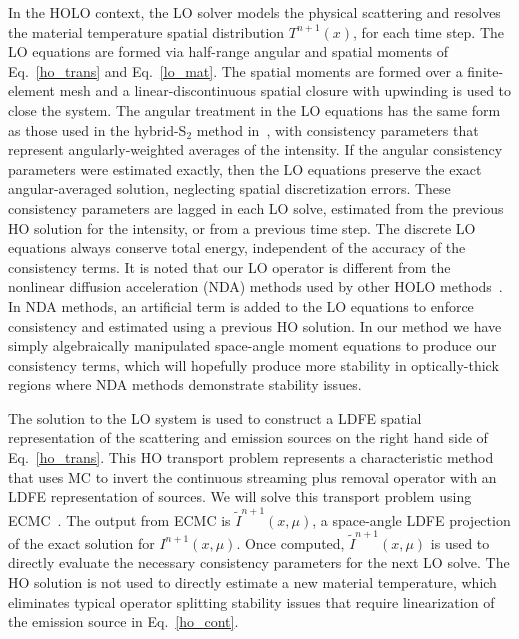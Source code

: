 \documentclass[11pt]{article}
\begin{document}
In the HOLO context, the LO solver models the physical scattering and
resolves the material temperature spatial distribution $T^{n+1}(x)$, for each time step.  The LO equations are formed via half-range 
angular and spatial moments of
Eq.~\eqref{ho_trans} and Eq.~\eqref{lo_mat}. The spatial moments are formed over a
finite-element
mesh and a linear-discontinuous spatial closure with upwinding is used to close the
system.  The angular treatment in the LO equations has the same form as those used in the
hybrid-S$_2$ method in~\cite{wolters},  with
consistency parameters that represent angularly-weighted averages of the intensity.
If the angular consistency parameters were estimated exactly, then
the LO equations preserve the exact angular-averaged solution,  neglecting spatial
discretization errors.  These consistency parameters are lagged in each LO solve,
estimated from the previous HO solution for the intensity, or from a previous time
step.  The discrete LO equations always conserve total energy, independent of the accuracy of the consistency terms.
It is noted that our LO operator is different from the nonlinear
diffusion acceleration (NDA) methods used by other HOLO methods~\cite{rmc,park,willert}.  In
NDA methods, an artificial term is added to the LO equations to enforce consistency and estimated using a
previous HO solution.  In our method we have simply algebraically 
manipulated space-angle moment equations to produce our consistency terms,
which will hopefully produce more
stability in optically-thick regions where NDA methods demonstrate stability issues.

The solution to the LO system is used to construct a LDFE spatial representation of
the scattering and emission sources on the right hand side of Eq.~\eqref{ho_trans}.
 This HO transport problem represents a characteristic method that uses MC to
invert the continuous streaming plus removal operator with an LDFE representation of
sources. We will solve this transport problem using ECMC~\cite{jake}.  The output from ECMC is
$\tilde{I}^{n+1}(x,\mu)$, a space-angle LDFE projection of the exact solution for
$I^{n+1}(x,\mu)$.  Once computed, $\tilde{I}^{n+1}(x,\mu)$ is used
to directly evaluate the necessary consistency parameters for the next LO solve.   The HO solution is not used to directly estimate a new
material temperature, which eliminates
typical operator splitting stability issues that require linearization of the
emission source in Eq.~\eqref{ho_cont}. 
\end{document}
